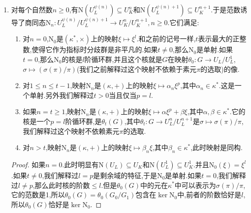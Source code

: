 \begin{enumerate}
\begin{enumerate}
\begin{proof}
	    	记$G=\mathrm{Gal}(L/K)$,对$u=\sum_ik_i\sigma_i\in\mathbb{Z}[G],x\in L$,记$x^u=\prod_i\sigma_i(x)^{k_i}$.那么$\mathrm{N}(1+x)=\prod_{\sigma\in G}(1+\sigma(x))=\sum x^u$,其中$u$取遍$\mathbb{Z}[G]$的系数为0或1的元,换句话讲$u$可以表示为$\sigma_{i_1}+\cdots+\sigma_{i_k}$,其中$\sigma_{i_j}$是两两不同的$G$中的元.记$n(u)=k$表示$u$的长度.那么长度0,1,l的$u$对$x^u$求和分别为$1$,$\mathrm{Tr}(x)$和$\mathrm{N}(x)$.所以问题归结为对$2\le n(u)\le l-1$的$x^u$求和落在$\mathrm{Tr}(\mathfrak{n}^{2n})$中.但是对这样的$u$有$\sigma u\not=u$,其中$\sigma$是$G$的生成元.于是$\{s^iu,0\le i\le l-1\}$作用在$x$上求和得到$\mathrm{Tr}(x^u)$,因为$n(u)\ge2$,导致$x^u\in\mathfrak{n}^{2n}$.得证.
	    \end{proof}
	\end{enumerate}
	\item 对每个自然数$n\ge0$,有$\mathrm{N}(U_L^{\psi(n)})\subseteq U_K^n$和$\mathrm{N}(U_L^{\psi(n)+1})\subseteq U_K^{n+1}$.于是范数诱导了商同态$\mathrm{N}_n:U_L^{\psi(n)}/U_L^{\psi(n)+1}\to U_K^n/U_K^{n+1},n\ge0$.它们满足:
	\begin{enumerate}
		\item 对$n=0$,$\mathrm{N}_0$是$(\kappa^*,\times)$上的映射$\xi\mapsto\xi^l$.和之前的记号一样,$t$表示最大的正整数,使得它作为指标时分歧群是非平凡的.如果$t\not=0$,那么$\mathrm{N}_0$是单射.如果$t=0$,那么$\mathrm{N}_0$的核是$l$阶循环群,并且这个核就是$G$在映射$\theta_0:G\to U_L/U_L^1$,$\sigma\mapsto(\sigma(\pi)/\pi)$(我们之前解释过这个映射不依赖于素元$\pi$的选取)的像.
		\item 对$1\le n\le t-1$,映射$\mathrm{N}_n$是$(\kappa,+)$上的映射$\xi\mapsto\alpha_n\xi^p$,其中$\alpha_n\in\kappa^*$.这是一个单射.另外我们解释过$t>0$当且仅当$p=l$.
		\item 如果$n=t\ge1$,映射$\mathrm{N}_n$是$(\kappa,+)$上的映射$\xi\mapsto\alpha\xi^p+\beta\xi$,其中$\alpha,\beta\in\kappa^*$.它的核是一个$p=l$阶循环群,是$\theta_t(G)$,其中$\theta_t:G\to U_L^n/U_L^{n+1}$是$\sigma\mapsto\sigma(\pi)/\pi$,我们解释过这个映射不依赖素元$\pi$的选取.
		\item 对$n>t$,映射$\mathrm{N}_n$是$(\kappa,+)$上的映射$\xi\mapsto\beta_n\xi$,其中$\beta_n\in\kappa^*$,此时映射是同构.
	\end{enumerate}
	\begin{proof}
		
		如果$n=0$.此时明显有$\mathrm{N}(U_L)\subseteq U_K$和$\mathrm{N}(U_L^1)\subseteq U_K^1$.并且$\mathrm{N}_0(\xi)=\xi^l$.如果$t\not=0$,我们解释过$l=p$是剩余域的特征,于是$\mathrm{N}_0$是单射.如果$t=0$,我们解释过$l\not=p$,那么此时核的阶数$\le l$.但是$\theta_0(G)$中的元在$\kappa^*$中可以表示为$\sigma(\pi)/\pi$,它的范数是1,所以$\theta_0(G)=\theta_0(G_0/G_1)$包含在$\ker\mathrm{N}_0$中,前者的阶数恰好是$l$,所以$\theta_0(G)$恰好是$\ker\mathrm{N}_0$.
		

\end{proof}
\end{enumerate}
